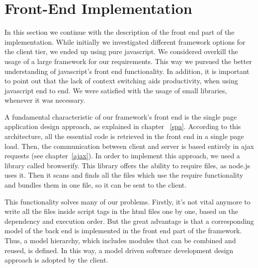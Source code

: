 \section{Front-End Implementation}
In this section we continue with the description of the front end part of the implementation. While initially we investigated different framework options for the client tier, we ended up using pure javascript. We considered overkill the usage of a large framework for our requirements. This way we pursued the better understanding of javascript's front end functionality. In addition, it is important to point out that the lack of context switching aids productivity, when using javascript end to end. We were satisfied with the usage of small libraries, whenever it was necessary. \par 
	A fundamental characteristic of our framework's front end is the single page application design approach, as explained in chapter ~\ref{spa}. According to this architecture, all the essential code is retrieved in the front end in a single page load. Then, the communication between client and server is based entirely in ajax requests (see chapter~\ref{ajax}). In order to implement this approach, we used a library called browserify. This library offers the ability to require files, as node.js uses it. Then it scans and finds all the files which use the require functionality and bundles them in one file, so it can be sent to the client. \par
	This functionality solves many of our problems. Firstly, it's not vital anymore to write all the files inside script tags in the html files one by one, based on the dependency and execution order. But the great advantage is that a corresponding model of the back end is implemented in the front end part of the framework. Thus, a model hierarchy, which includes modules that can be combined and reused, is defined. In this way, a model driven software development design approach is adopted by the client.

